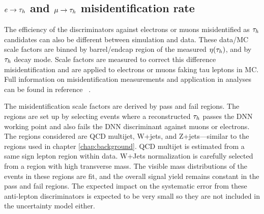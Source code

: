 \subsection{$e \rightarrow \tau_h$  and $\mu \rightarrow \tau_h$ misidentification rate}
The efficiency of the discriminators against electrons or muons misidentified as $\tau_h$ candidates can also be different between simulation and data. 
These data/MC scale factors are
binned by barrel/endcap region of the measured $\eta(\tau_h)$, and by $\tau_h$ decay mode.
Scale factors are measured to correct this difference misidentification and are applied to electrons or muons faking tau leptons in MC. 
Full information on misidentification measurements and application in analyses can be found in reference ~\cite{TAUIDTwiki}. 


The misidentification scale factors are derived by pass and fail regions. The regions are set up by selecting events where a reconstructed $\tau_h$ passes the DNN working point and also fails the DNN discriminant against muons or electrons. The regions considered are QCD multijet, W+jets, and Z+jets---similar to the regions used in chapter \ref{chap:background}. QCD multijet is estimated from a same sign lepton region within data. W+Jets normalization is carefully selected from a region with high transverse mass. The visible mass distributions of the events in these regions are fit, and the overall signal yield remains constant in the pass and fail regions. 
The expected impact on the systematic error from these anti-lepton discriminators is expected to be very small so they are not included in the uncertainty model either.



